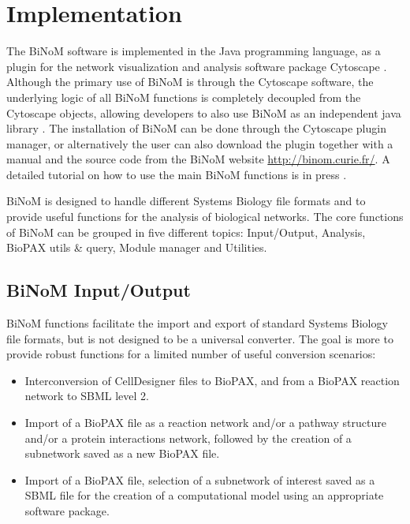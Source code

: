 \documentclass[10pt]{bmc_article}
\newenvironment{bmcformat}{\baselineskip20pt\sloppy\setboolean{publ}{false}}{\baselineskip20pt\sloppy}
\begin{document}
\begin{bmcformat}
\section*{Implementation}
The BiNoM software is implemented in the Java programming language, as a plugin
for the network visualization and analysis software package Cytoscape
\cite{cline2007integration}. Although the primary use of BiNoM is through the
Cytoscape software, the underlying logic of all BiNoM functions is completely
decoupled from the Cytoscape objects, allowing developers to also use BiNoM as
an independent java library \cite{zinovyev2008binom}. The installation of BiNoM
can be done through the Cytoscape plugin manager, or alternatively the user can
also download the plugin together with a manual and the source code from the
BiNoM website
\url{http://binom.curie.fr/}. A detailed tutorial on how to use the main BiNoM
functions is in press
\cite{binomBookChapter}.


BiNoM is designed to handle different Systems Biology file formats and to
provide useful functions for the analysis of biological networks. The core
functions of BiNoM can be grouped in five different topics: Input/Output,
Analysis, BioPAX utils \& query, Module manager and Utilities.


\subsection*{BiNoM Input/Output}

BiNoM functions facilitate the import and export of standard Systems Biology
file formats, but is not designed to be a universal converter. The goal is more
to provide robust functions for a limited number of useful conversion
scenarios: 

\begin{itemize}

\item Interconversion of CellDesigner files to BioPAX, and from a BioPAX
reaction network to SBML level 2.

\item Import of a BioPAX file as a reaction network and/or a pathway structure
and/or a protein interactions network, followed by the creation of a subnetwork
saved as a new BioPAX file. 

\item Import of a BioPAX file, selection of a subnetwork of interest saved as a SBML file for
the creation of a computational model using an appropriate software package.


\end{itemize}
\end{bmcformat}
\end{document}
